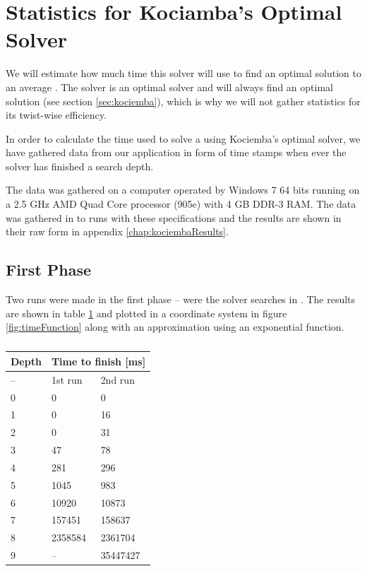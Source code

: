 \section{Statistics for Kociamba's Optimal Solver}
\label{app:kociembaTime}
We will estimate how much time this solver will use to find an optimal solution to an average \rubik{}.
The solver is an optimal solver and will always find an optimal solution (see section \ref{sec:kociemba}), which is why we will not gather statistics for its twist-wise efficiency.

In order to calculate the time used to solve a \rubik{} using Kociemba's optimal solver, we have gathered data from our application in form of time stamps when ever the solver has finished a search depth.

The data was gathered on a computer operated by Windows 7 64 bits running on a 2.5 GHz AMD Quad Core processor (905e) with 4 GB DDR-3 RAM.
The data was gathered in to runs with these specifications and the results are shown in their raw form in appendix \ref{chap:kociembaResults}.

\subsection{First Phase}
Two runs were made in the first phase -- were the solver searches in .
The results are shown in table \ref{tab:timeData} and plotted in a coordinate system in figure \ref{fig:timeFunction} along with an approximation using an exponential function.
\begin{table}[htb]
\centering
	\begin{tabular}{|l|l|l|}
	\hline
	Depth& \multicolumn{2}{|c|}{Time to finish [ms]}\\
	\hline
	--&1st run&2nd run\\
	\hline
	0&0&0\\
	\hline
	1&0&16\\
	\hline
	2&0&31\\
	\hline
	3&47&78\\
	\hline
	4&281&296\\
	\hline
	5&1045&983\\
	\hline
	6&10920&10873\\
	\hline
	7&157451&158637\\
	\hline
	8&2358584&2361704\\
	\hline
	9&--&35447427\\
	\hline
	\end{tabular}
\caption{}
	\label{tab:timeData}
\end{table}

